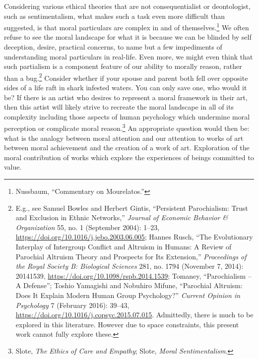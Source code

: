 \documentclass[phdthesis,12pt,final,a4paper]{wuthesis}
\theoremstyle{definition}
\theoremstyle{definition}
\theoremstyle{definition}
\theoremstyle{definition}
\theoremstyle{remark}
\begin{document}
Considering various ethical theories that are not consequentialist or deontologist, such as sentimentalism, what makes such a task even more difficult than suggested, is that moral particulars are complex in and of themselves.\footnote{Nussbaum, {``Commentary on {Mourelatos}.''}} We often refuse to see the moral landscape for what it is because we can be blinded by self deception, desire, practical concerns, to name but a few impediments of understanding moral particulars in real-life. Even more, we might even think that such partialism is a component feature of our ability to morally reason, rather than a bug.\footnote{E.g., see Samuel Bowles and Herbert Gintis, {``Persistent {Parochialism}: {Trust} and Exclusion in Ethnic Networks,''} \emph{Journal of Economic Behavior \& Organization} 55, no. 1 (September 2004): 1--23, \url{https://doi.org/10.1016/j.jebo.2003.06.005}; Hannes Rusch, {``The Evolutionary Interplay of Intergroup Conflict and Altruism in Humans: A Review of Parochial Altruism Theory and Prospects for Its Extension,''} \emph{Proceedings of the Royal Society B: Biological Sciences} 281, no. 1794 (November 7, 2014): 20141539, \url{https://doi.org/10.1098/rspb.2014.1539}; Tomaney, {``Parochialism -- {A Defense}''}; Toshio Yamagishi and Nobuhiro Mifune, {``Parochial {Altruism}: {Does It Explain Modern Human Group Psychology}?''} \emph{Current Opinion in Psychology} 7 (February 2016): 39--43, \url{https://doi.org/10.1016/j.copsyc.2015.07.015}. Admittedly, there is much to be explored in this literature. However due to space constraints, this present work cannot fully explore these.} Consider whether if your spouse and parent both fell over opposite sides of a life raft in shark infested waters. You can only save one, who would it be? If there is an artist who desires to represent a moral framework in their art, then this artist will likely strive to recreate the moral landscape in all of its complexity including those aspects of human psychology which undermine moral perception or complicate moral reason.\footnote{Slote, \emph{The {Ethics} of {Care} and {Empathy}}; Slote, \emph{Moral {Sentimentalism}}.} An appropriate question would then be: what is the analogy between moral attention and our attention to works of art between moral achievement and the creation of a work of art. Exploration of the moral contribution of works which explore the experiences of beings committed to value.
\end{document}

